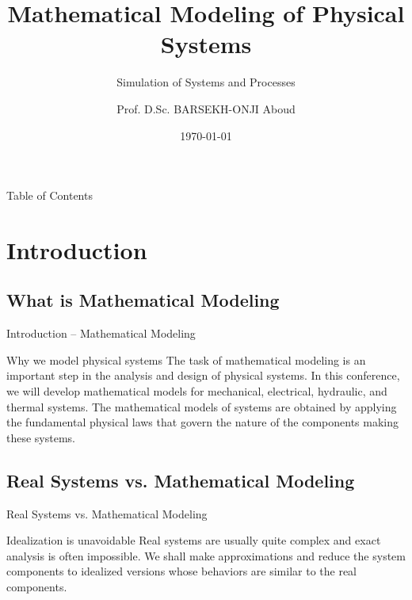 \documentclass[aspectratio=169,xcolor=dvipsnames]{beamer}
\title{Mathematical Modeling of Physical Systems}
\subtitle{Simulation of Systems and Processes}
\author{Prof. D.Sc. BARSEKH-ONJI Aboud}
\institute{
    Facultad de Ingenier\'ia \\
    Universidad An\'ahuac M\'exico
}
\date{\today}
\begin{document}
\begin{frame}
    \titlepage
\end{frame}

\begin{frame}{Table of Contents}
    \tableofcontents
\end{frame}

\section{Introduction}

\subsection{What is Mathematical Modeling}
\begin{frame}{Introduction -- Mathematical Modeling}
    \begin{block}{Why we model physical systems}
        The task of mathematical modeling is an important step in the analysis and design of physical systems. In this conference, we will develop mathematical models for mechanical, electrical, hydraulic, and thermal systems. The mathematical models of systems are obtained by applying the fundamental physical laws that govern the nature of the components making these systems.
    \end{block}
\end{frame}

\subsection{Real Systems vs. Mathematical Modeling}
\begin{frame}{Real Systems vs. Mathematical Modeling}
    \begin{alertblock}{Idealization is unavoidable}
        Real systems are usually quite complex and exact analysis is often impossible. We shall make approximations and reduce the system components to idealized versions whose behaviors are similar to the real components.
    \end{alertblock}
\end{frame}
\end{document}
